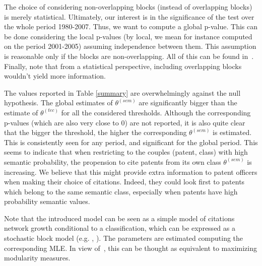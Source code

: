 The choice of considering non-overlapping blocks (instead of overlapping blocks) is merely statistical. Ultimately, our interest is in the significance of the test over the whole period 1980-2007. Thus, we want to compute a global p-value. This can be done considering the local p-values (by local, we mean for instance computed on the period 2001-2005) assuming independence between them. This assumption is reasonable only if the blocks are non-overlapping. All of this can be found in~. Finally, note that from a statistical perspective, including overlapping blocks wouldn't yield more information.

The values reported in Table \ref{summary} are overwhelmingly against the null hypothesis. The global estimates of $\theta^{(sem)}$ are significantly bigger than the estimate of $\theta^{(tec)}$ for all the considered thresholds. Although the corresponding p-values (which are also very close to 0) are not reported, it is also quite clear that the bigger the threshold, the higher the corresponding $\theta^{(sem)}$ is estimated. This is consistently seen for any period, and significant for the global period. This seems to indicate that when restricting to the couples (patent, class) with high semantic probability, the propension to cite patents from its own class $\theta^{(sem)}$ is increasing. We believe that this might provide extra information to patent officers when making their choice of citations. Indeed, they could look first to patents which belong to the same semantic class, especially when patents have high probability semantic values.  

Note that the introduced model can be seen as a simple model of citations network growth conditional to a classification, which can be expressed as a stochastic block model (e.g. \cite{decelle2011asymptotic}, \cite{valles2016multilayer}). The parameters are estimated computing the corresponding MLE. In view of~\cite{2016arXiv160602319N}, this can be thought as equivalent to maximizing modularity measures.





